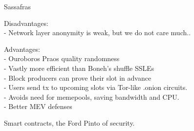 \documentclass{beamer}
\begin{document}
\begin{frame}{Sassafras}

Disadvantages: \\
- Network layer anonymity is weak, but we do not care much.. \\

\bigskip\bigskip

Advantages: \\ \smallskip
- Ouroboros Praos quality randomness \\ \smallskip
- Vastly more efficient than Boneh's shuffle SSLEs \\ \smallskip
- Block producers can prove their slot in advance \\ \smallskip
- Users send tx to upcoming slots via Tor-like {.onion} circuits. \\ \smallskip
- Avoids need for memepools, saving bandwidth and CPU. \\ \smallskip
- Better MEV defenses \\ \smallskip

\pause\bigskip\bigskip

\hspace{10pt} Smart contracts, the Ford Pinto of security.

\end{frame}
\end{document}

